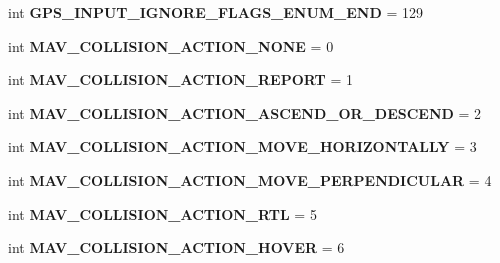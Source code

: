 \begin{DoxyCompactItemize}
\mbox{\label{namespacepymavlink_1_1dialects_1_1v10_adec99368984b6e6cfeb8d39ca0588208}} 
int {\bfseries G\+P\+S\+\_\+\+I\+N\+P\+U\+T\+\_\+\+I\+G\+N\+O\+R\+E\+\_\+\+F\+L\+A\+G\+S\+\_\+\+E\+N\+U\+M\+\_\+\+E\+ND} = 129
\item 
\mbox{\label{namespacepymavlink_1_1dialects_1_1v10_a202c184c4ca9e830122b968548cfe432}} 
int {\bfseries M\+A\+V\+\_\+\+C\+O\+L\+L\+I\+S\+I\+O\+N\+\_\+\+A\+C\+T\+I\+O\+N\+\_\+\+N\+O\+NE} = 0
\item 
\mbox{\label{namespacepymavlink_1_1dialects_1_1v10_a694b62eddea3d47eed52f78d2db09645}} 
int {\bfseries M\+A\+V\+\_\+\+C\+O\+L\+L\+I\+S\+I\+O\+N\+\_\+\+A\+C\+T\+I\+O\+N\+\_\+\+R\+E\+P\+O\+RT} = 1
\item 
\mbox{\label{namespacepymavlink_1_1dialects_1_1v10_a37ae3b57ca930d1e773fb37ab105706e}} 
int {\bfseries M\+A\+V\+\_\+\+C\+O\+L\+L\+I\+S\+I\+O\+N\+\_\+\+A\+C\+T\+I\+O\+N\+\_\+\+A\+S\+C\+E\+N\+D\+\_\+\+O\+R\+\_\+\+D\+E\+S\+C\+E\+ND} = 2
\item 
\mbox{\label{namespacepymavlink_1_1dialects_1_1v10_a844820d023fd901e9e2a3ce9d559abf3}} 
int {\bfseries M\+A\+V\+\_\+\+C\+O\+L\+L\+I\+S\+I\+O\+N\+\_\+\+A\+C\+T\+I\+O\+N\+\_\+\+M\+O\+V\+E\+\_\+\+H\+O\+R\+I\+Z\+O\+N\+T\+A\+L\+LY} = 3
\item 
\mbox{\label{namespacepymavlink_1_1dialects_1_1v10_ac0badbf89e3c2cbadee833660ca59158}} 
int {\bfseries M\+A\+V\+\_\+\+C\+O\+L\+L\+I\+S\+I\+O\+N\+\_\+\+A\+C\+T\+I\+O\+N\+\_\+\+M\+O\+V\+E\+\_\+\+P\+E\+R\+P\+E\+N\+D\+I\+C\+U\+L\+AR} = 4
\item 
\mbox{\label{namespacepymavlink_1_1dialects_1_1v10_ab379bec9f15322dfc96ae079d66b5725}} 
int {\bfseries M\+A\+V\+\_\+\+C\+O\+L\+L\+I\+S\+I\+O\+N\+\_\+\+A\+C\+T\+I\+O\+N\+\_\+\+R\+TL} = 5
\item 
\mbox{\label{namespacepymavlink_1_1dialects_1_1v10_aacd89cb34e1ef275403b3d05031ae00a}} 
int {\bfseries M\+A\+V\+\_\+\+C\+O\+L\+L\+I\+S\+I\+O\+N\+\_\+\+A\+C\+T\+I\+O\+N\+\_\+\+H\+O\+V\+ER} = 6

\end{DoxyCompactItemize}
